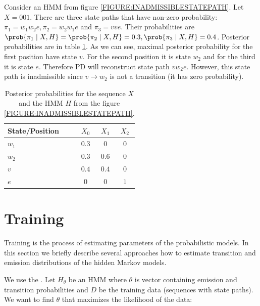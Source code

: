 
\begin{example}
Consider an HMM from figure \ref{FIGURE:INADMISSIBLESTATEPATH}. Let $X=001$. There
are three state paths that have non-zero probability:
$\pi_1=w_1w_2e,\pi_2=w_2w_1e$ and $\pi_3=vve$. Their probabilities are
$\prob{\pi_1\mid X,H}=\prob{\pi_2\mid X,H}=0.3, \prob{\pi_3\mid X,H}=0.4$.
Posterior probabilities are in table \ref{TABLE:INADMISSIBLESTATEPATH}.
As we can see, maximal posterior probability for the first position have state
$v$. For the second position it is state $w_2$ and for the third it is state
$e$. Therefore PD will reconstruct state path $vw_2e$. However, this state path 
is inadmissible since  $v\to w_2$ is not a transition (it has zero probability).

\begin{table}
\begin{center}
\begin{tabular}{|l|c|c|c|}
\hline
State/Position & $X_0$ & $X_1$ & $X_2$ \\\hline
$w_1$ & $0.3$ & $0$ & $0$ \\\hline
$w_2$ & $0.3$ & $0.6$ & $0$ \\\hline
$v$   & $0.4$ & $0.4$ & $0$\\\hline
$e$  & $0$ & $0$ & $1$ \\\hline
\end{tabular}
\end{center}
\caption[Example of posterior probabilities.]{Posterior probabilities for
the sequence $X$ and the HMM $H$ from the figure \ref{FIGURE:INADMISSIBLESTATEPATH}.
}\label{TABLE:INADMISSIBLESTATEPATH}
\end{table}

\end{example}


\section{Training} 

Training is the process of estimating parameters of the probabilistic models. In this
section we briefly describe several approaches how to estimate transition and
emission distributions of the hidden Markov models.

We use the . Let $H_{\theta}$ be an HMM
where $\theta$ is vector containing emission and transition probabilities and
$D$ be the training data (sequences with state paths).  We
want to find $\theta$ that maximizes the likelihood of the data:

